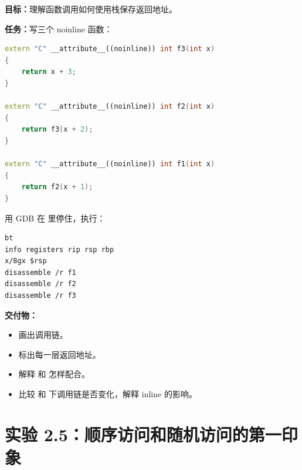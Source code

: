 \begin{labbox}
\textbf{目标：}理解函数调用如何使用栈保存返回地址。

\textbf{任务：}写三个 noinline 函数：

\begin{lstlisting}[language=C++]
extern "C" __attribute__((noinline)) int f3(int x)
{
    return x + 3;
}

extern "C" __attribute__((noinline)) int f2(int x)
{
    return f3(x + 2);
}

extern "C" __attribute__((noinline)) int f1(int x)
{
    return f2(x + 1);
}
\end{lstlisting}

用 GDB 在  里停住，执行：

\begin{lstlisting}
bt
info registers rip rsp rbp
x/8gx $rsp
disassemble /r f1
disassemble /r f2
disassemble /r f3
\end{lstlisting}

\textbf{交付物：}

\begin{itemize}
  \item 画出调用链。
  \item 标出每一层返回地址。
  \item 解释  和  怎样配合。
  \item 比较  和  下调用链是否变化，解释 inline 的影响。
\end{itemize}
\end{labbox}

\section{实验 2.5：顺序访问和随机访问的第一印象}

